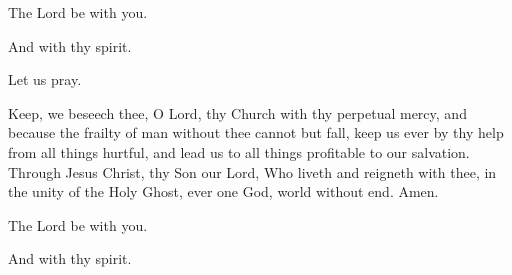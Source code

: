 


\rubric{\Vbar}The Lord be with you.

\rubric{\Rbar}And with thy spirit.

Let us pray.

Keep, we beseech thee, O Lord, thy Church with thy perpetual mercy, and because the frailty of man without thee cannot but fall, keep us ever by thy help from all things hurtful, and lead us to all things profitable to our salvation. Through Jesus Christ, thy Son our Lord, Who liveth and reigneth with thee, in the unity of the Holy Ghost, ever one God, world without end. \rubric{\Rbar} Amen.

\rubric{\Vbar}The Lord be with you.

\rubric{\Rbar}And with thy spirit.
